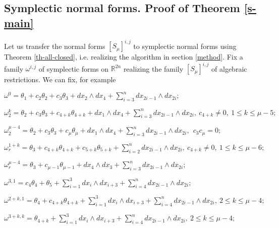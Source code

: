 \documentclass{amsart}
\theoremstyle{definition}
\numberwithin{equation}{section}
\begin{document}
\subsection{Symplectic normal forms. Proof of Theorem \ref{s-main}}
\label{s-normal}

Let us transfer the normal forms $[S_{\mu}]^{i,j}$  to symplectic normal forms using Theorem \ref{th-all-closed},
i.e. realizing the algorithm in section \ref{method}. Fix a family $\omega ^{i,j}$ of symplectic
forms on $\mathbb R^{2n}$ realizing the family $[S_{\mu}]^{i,j}$ of algebraic restrictions.  We can fix, for example

\smallskip

\noindent $\omega ^0 = \theta _1 + c_2\theta _2 + c_3\theta _3 +
dx_2\wedge dx_4 + \sum_{i=3}^n dx_{2i-1} \wedge dx_{2i};$

\smallskip

\noindent $\omega ^{k}_2\! = \theta _2 + c_3\theta _3 + c_{4+k}\theta _{4+k} +
 dx_1\wedge dx_4+ \sum_{i=3}^n dx_{2i-1} \wedge dx_{2i}, \  c_{4+k}\!\ne\! 0, \ 1\leq k\leq \mu-\!5; $

 \smallskip

\noindent $\omega ^{\mu-4}_2\! = \theta _2 + c_3\theta _3 + c_{\mu}\theta_{\mu} +
 dx_1\wedge dx_4+ \sum_{i=3}^n dx_{2i-1} \wedge dx_{2i}, \ \ c_3 c_{\mu}=0;$

 \smallskip

\noindent $\omega ^{1+k}_r\!= \theta_3\!+ c_{4+k}\theta_{4+k}\!+ c_{5+k}\theta _{5+k}\!+
 \sum_{i=2}^n dx_{2i-1} \wedge dx_{2i}, \ c_{4+k}\!\ne\! 0, \ 1\!\leq\! k\!\leq\! \mu-\!6;$

 \smallskip

\noindent $\omega ^{\mu-4}_r\! =  \theta _3 + c_{\mu-1} \theta _{\mu-1} +
 dx_4\wedge dx_3+ \sum_{i=3}^n dx_{2i-1} \wedge dx_{2i}; $

\smallskip

\noindent $\omega ^{3,1}\! = c_4\theta _4\!+ \theta _{5}\!+ \sum_{i=1}^3 dx_i \wedge dx_{i+3}\!+ \sum_{i=4}^n dx_{2i-1} \wedge dx_{2i};$

\smallskip

\noindent $\omega ^{2+k,1}\! = \theta _4\!+ c_{4+k}\theta _{4+k}\!+ \sum_{i=1}^3 dx_i \wedge dx_{i+3}\!+ \sum_{i=4}^n dx_{2i-1} \wedge dx_{2i},  \ 2\!\leq\!k\!\leq\!\mu-\!4;$

\smallskip

\noindent $\omega ^{3+k,k}\! = \theta _{4+k} + \sum_{i=1}^3 dx_i \wedge dx_{i+3}+ \sum_{i=4}^n dx_{2i-1} \wedge dx_{2i}, \  2\leq k\leq \mu-\!4;$
\end{document}

